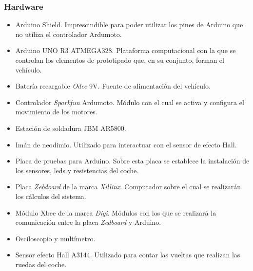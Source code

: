 \subsubsection{Hardware}
\begin{itemize}
\item Arduino Shield. Imprescindible para poder utilizar los pines de Arduino que no utiliza el controlador Ardumoto.
\item Arduino UNO R3 ATMEGA328. Plataforma computacional con la que se controlan los elementos de prototipado que, en su conjunto, forman el vehículo.
\item Batería recargable \emph{Odec} 9V. Fuente de alimentación del vehículo.
\item Controlador \emph{Sparkfun} Ardumoto. Módulo con el cual se activa y configura el movimiento de los motores.
\item Estación de soldadura JBM AR5800.
\item Imán de neodimio. Utilizado para interactuar con el sensor de efecto Hall.
\item Placa de pruebas para Arduino. Sobre esta placa se establece la instalación de los sensores, leds y resistencias del coche.
\item Placa \emph{Zebdoard} de la marca \emph{Xillinx}. Computador sobre el cual se realizarán los cálculos del sistema.
\item Módulo Xbee de la marca \emph{Digi}. Módulos con los que se realizará la comunicación entre la placa \emph{Zedboard} y Arduino.
\item Osciloscopio y multímetro.
\item Sensor efecto Hall A3144. Utilizado para contar las vueltas que realizan las ruedas del coche.
\end{itemize}